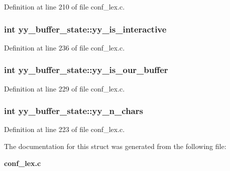 Definition at line 210 of file conf\_\-lex.c.
\subsubsection[{yy\_\-is\_\-interactive}]{\setlength{\rightskip}{0pt plus 5cm}int {\bf yy\_\-buffer\_\-state::yy\_\-is\_\-interactive}}\label{structyy__buffer__state_bf5c70eea75581b58c0ee7bd31b14490}




Definition at line 236 of file conf\_\-lex.c.
\subsubsection[{yy\_\-is\_\-our\_\-buffer}]{\setlength{\rightskip}{0pt plus 5cm}int {\bf yy\_\-buffer\_\-state::yy\_\-is\_\-our\_\-buffer}}\label{structyy__buffer__state_80ce2431c70dc4f89ced487f18449465}




Definition at line 229 of file conf\_\-lex.c.
\subsubsection[{yy\_\-n\_\-chars}]{\setlength{\rightskip}{0pt plus 5cm}int {\bf yy\_\-buffer\_\-state::yy\_\-n\_\-chars}}\label{structyy__buffer__state_06406208824817acfec2183b79080945}




Definition at line 223 of file conf\_\-lex.c.

The documentation for this struct was generated from the following file:\begin{CompactItemize}
\item 
{\bf conf\_\-lex.c}\end{CompactItemize}
